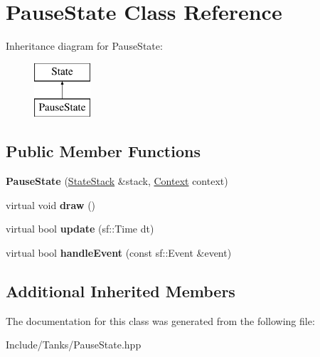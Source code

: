 \hypertarget{class_pause_state}{}\section{Pause\+State Class Reference}
\label{class_pause_state}
Inheritance diagram for Pause\+State\+:\begin{figure}[H]
\begin{center}
\leavevmode
\includegraphics[height=2.000000cm]{class_pause_state}
\end{center}
\end{figure}
\subsection*{Public Member Functions}
\begin{DoxyCompactItemize}
\item 
\hypertarget{class_pause_state_ac5c14226e18f688233f5b511e1025a59}{}{\bfseries Pause\+State} (\hyperlink{class_state_stack}{State\+Stack} \&stack, \hyperlink{struct_state_1_1_context}{Context} context)\label{class_pause_state_ac5c14226e18f688233f5b511e1025a59}

\item 
\hypertarget{class_pause_state_aa8b7af8bba45641c2955c059332a0ba4}{}virtual void {\bfseries draw} ()\label{class_pause_state_aa8b7af8bba45641c2955c059332a0ba4}

\item 
\hypertarget{class_pause_state_a534fe408bf762e3d0f9b4cc6d4cb4cec}{}virtual bool {\bfseries update} (sf\+::\+Time dt)\label{class_pause_state_a534fe408bf762e3d0f9b4cc6d4cb4cec}

\item 
\hypertarget{class_pause_state_a655928c17ca2e78c98d028fed78257ac}{}virtual bool {\bfseries handle\+Event} (const sf\+::\+Event \&event)\label{class_pause_state_a655928c17ca2e78c98d028fed78257ac}

\end{DoxyCompactItemize}
\subsection*{Additional Inherited Members}


The documentation for this class was generated from the following file\+:\begin{DoxyCompactItemize}
\item 
Include/\+Tanks/Pause\+State.\+hpp\end{DoxyCompactItemize}
